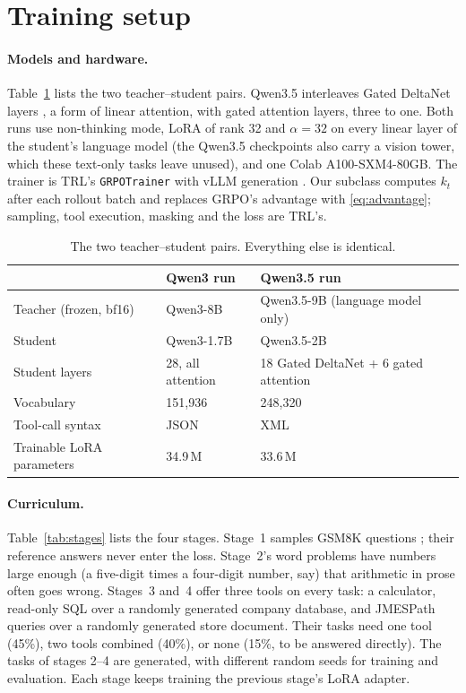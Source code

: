 \documentclass[11pt,a4paper]{article}
\begin{document}
\section{Training setup}
\label{sec:setup}

\paragraph{Models and hardware.}
Table~\ref{tab:models} lists the two teacher--student pairs. Qwen3.5
\citep{qwen2026qwen35} interleaves Gated DeltaNet layers
\citep{yang2025gateddeltanet}, a form of linear attention, with gated
attention layers, three to one. Both runs use non-thinking mode, LoRA \citep{hu2022lora} of rank 32 and $\alpha=32$ on
every linear layer of the student's language model (the Qwen3.5 checkpoints
also carry a vision tower, which these text-only tasks leave unused), and
one Colab A100-SXM4-80GB. The trainer is TRL's \texttt{GRPOTrainer}
\citep{vonwerra2020trl} with vLLM generation \citep{kwon2023vllm}. Our
subclass computes $k_t$ after each rollout batch and replaces GRPO's
advantage with \eqref{eq:advantage}; sampling, tool execution, masking and
the loss are TRL's.

\begin{table}[t]
\centering\small
\caption{The two teacher--student pairs. Everything else is identical.}
\label{tab:models}
\begin{tabular}{@{}lll@{}}
\toprule
\headrow & Qwen3 run & Qwen3.5 run \\
\midrule
Teacher (frozen, bf16) & Qwen3-8B & Qwen3.5-9B (language model only) \\
Student & Qwen3-1.7B & Qwen3.5-2B \\
Student layers & 28, all attention & 18 Gated DeltaNet + 6 gated attention \\
Vocabulary & 151{,}936 & 248{,}320 \\
Tool-call syntax & JSON & XML \\
Trainable LoRA parameters & 34.9\,M & 33.6\,M \\
\bottomrule
\end{tabular}
\end{table}

\paragraph{Curriculum.}
Table~\ref{tab:stages} lists the four stages. Stage~1 samples GSM8K questions
\citep{cobbe2021gsm8k}; their reference answers never enter the loss.
Stage~2's word problems have numbers large enough (a five-digit
times a four-digit number, say) that arithmetic in prose often goes wrong.
Stages~3 and~4 offer three tools on every task: a calculator, read-only SQL
over a randomly generated company database, and JMESPath queries over a
randomly generated store document. Their tasks need one tool (45\%), two
tools combined (40\%), or none (15\%, to be answered directly). The tasks of
stages 2--4 are generated, with different random seeds for training and
evaluation. Each stage keeps training the previous stage's LoRA adapter.
\end{document}
